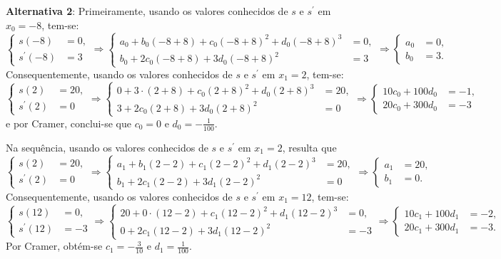 \documentclass[12pt,a4paper]{article}
\begin{document}
\begin{ExerciseList}
\textbf{Alternativa 2}: Primeiramente, usando os valores conhecidos de $s$ e $s^\prime$ em $x_0 = -8$, tem-se:
\[
  \begin{cases}
    s(-8) & = 0, \\
    s^\prime(-8) & = 3
  \end{cases}
  \Rightarrow
  \begin{cases}
    a_0 + b_0(-8 + 8) + c_0(-8 + 8)^2 + d_0(-8 + 8)^3 & = 0, \\
    b_0 + 2c_0(-8 + 8) +3d_0(-8 + 8)^2 & = 3
  \end{cases}
  \Rightarrow
  \begin{cases}
    a_0 & = 0, \\
    b_0 & = 3.
  \end{cases}
\]
Consequentemente, usando os valores conhecidos de $s$ e $s^\prime$ em $x_1 = 2$, tem-se:
\[
  \begin{cases}
    s(2) & = 20, \\
    s^\prime(2) & = 0
  \end{cases}
  \Rightarrow
  \begin{cases}
    0 + 3\cdot (2 + 8) + c_0(2 + 8)^2 + d_0(2 + 8)^3 & = 20, \\
    3 + 2c_0(2 + 8) +3d_0(2 + 8)^2 & = 0
  \end{cases}
  \Rightarrow
  \begin{cases}
    10 c_0 + 100 d_0 & = -1, \\
    20 c_0 + 300 d_0 & = -3
  \end{cases}
\]
e por Cramer, conclui-se que $c_0 = 0$ e $d_0 = -\frac{1}{100}$.

Na sequência, usando os valores conhecidos de $s$ e $s^\prime$ em $x_1 = 2$, resulta que
\[
  \begin{cases}
    s(2) & = 20, \\
    s^\prime(2) & = 0
  \end{cases}
  \Rightarrow
  \begin{cases}
    a_1 + b_1(2 - 2) + c_1(2 - 2)^2 + d_1(2 - 2)^3 & = 20, \\
    b_1 + 2c_1(2 - 2) +3d_1(2 - 2)^2 & = 0
  \end{cases}
  \Rightarrow
  \begin{cases}
    a_1 & = 20, \\
    b_1 & = 0.
  \end{cases}
\]
Consequentemente, usando os valores conhecidos de $s$ e $s^\prime$ em $x_1 = 12$, tem-se:
\[
  \begin{cases}
    s(12) & = 0, \\
    s^\prime(12) & = -3
  \end{cases}
  \Rightarrow
  \begin{cases}
    20 + 0\cdot (12 - 2) + c_1(12 - 2)^2 + d_1(12 - 2)^3 & = 0, \\
    0 + 2c_1(12 - 2) +3d_1(12 - 2)^2 & = -3
  \end{cases}
  \Rightarrow
  \begin{cases}
    10 c_1 + 100 d_1 & = -2, \\
    20 c_1 + 300 d_1 & = -3.
  \end{cases}
\]
Por Cramer, obtém-se $c_1 = -\frac{3}{10}$ e $d_1 = \frac{1}{100}$.


\end{ExerciseList}
\end{document}
